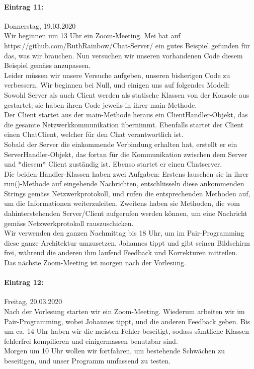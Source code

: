 \documentclass[12pt]{article}
\begin{document}
\paragraph{Eintrag 11:}
Donnerstag, 19.03.2020\\
Wir beginnen um 13 Uhr ein Zoom-Meeting. Mei hat auf\\ https://github.com/RuthRainbow/Chat-Server/ ein gutes Beispiel gefunden f\"ur das, was wir brauchen. Nun versuchen wir unseren vorhandenen Code diesem Beispiel gem\"ass anzupassen.\\
Leider m\"ussen wir unsere Versuche aufgeben, unseren bisherigen Code zu verbessern. Wir beginnen bei Null, und einigen uns auf folgendes Modell:\\
Sowohl Server als auch Client werden als statische Klassen von der Konsole aus gestartet; sie haben ihren Code jeweils in ihrer main-Methode.\\
Der Client startet aus der main-Methode heraus ein ClientHandler-Objekt, das die gesamte Netzwerkkommunikation \"ubernimmt. Ebenfalls startet der Client einen ChatClient, welcher f\"ur den Chat verantwortlich ist.\\
Sobald der Server die einkommende Verbindung erhalten hat, erstellt er ein ServerHandler-Objekt, das fortan f\"ur die Kommunikation zwischen dem Server und *diesem* Client zust\"andig ist. Ebenso startet er einen Chatserver.\\
Die beiden Handler-Klassen haben zwei Aufgaben: Erstens lauschen sie in ihrer run()-Methode auf eingehende Nachrichten, entschl\"usseln diese ankommenden Strings gem\"ass Netzwerkprotokoll, und rufen die entsprechenden Methoden auf, um die Informationen weiterzuleiten. Zweitens haben sie Methoden, die vom dahinterstehenden Server/Client aufgerufen werden k\"onnen, um eine Nachricht gem\"ass Netzwerkprotokoll rauszuschicken.\\
Wir verwenden den ganzen Nachmittag bis 18 Uhr, um im Pair-Programming diese ganze Architektur umzusetzen. Johannes tippt und gibt seinen Bildschirm frei, w\"ahrend die anderen ihm laufend Feedback und Korrekturen mitteilen.\\
Das n\"achste Zoom-Meeting ist morgen nach der Vorlesung.

\paragraph{Eintrag 12:}
Freitag, 20.03.2020\\
Nach der Vorlesung starten wir ein Zoom-Meeting. Wiederum arbeiten wir im Pair-Programming, wobei Johannes tippt, und die anderen Feedback geben. Bis um ca. 14 Uhr haben wir die meisten Fehler beseitigt, sodass s\"amtliche Klassen fehlerfrei kompilieren und einigermassen benutzbar sind.\\
Morgen um 10 Uhr wollen wir fortfahren, um bestehende Schw\"achen zu beseitigen, und unser Programm umfassend zu testen.
\end{document}
